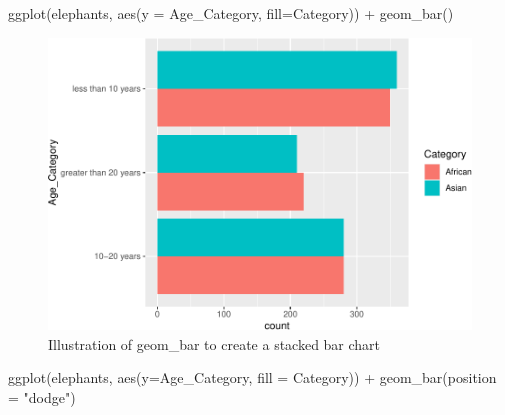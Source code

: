 \documentclass[
]{book}
\newenvironment{Shaded}{\begin{snugshade}}{\end{snugshade}}
\newcommand{\AttributeTok}[1]{\textcolor[rgb]{0.77,0.63,0.00}{#1}}
\newcommand{\FunctionTok}[1]{\textcolor[rgb]{0.00,0.00,0.00}{#1}}
\newcommand{\NormalTok}[1]{#1}
\newcommand{\SpecialCharTok}[1]{\textcolor[rgb]{0.00,0.00,0.00}{#1}}
\newcommand{\StringTok}[1]{\textcolor[rgb]{0.31,0.60,0.02}{#1}}
\begin{document}
\begin{Shaded}
\begin{Highlighting}[]
\FunctionTok{ggplot}\NormalTok{(elephants, }\FunctionTok{aes}\NormalTok{(}\AttributeTok{y =}\NormalTok{ Age\_Category, }\AttributeTok{fill=}\NormalTok{Category)) }\SpecialCharTok{+} 
  \FunctionTok{geom\_bar}\NormalTok{()}
\end{Highlighting}
\end{Shaded}

\begin{figure}
\centering
\includegraphics{Data-Visualisation-geom-Encyclopedia_files/figure-latex/unnamed-chunk-20-1.pdf}
\caption{\label{fig:unnamed-chunk-20}Illustration of geom\_bar to create a stacked bar chart}
\end{figure}

\begin{Shaded}
\begin{Highlighting}[]
\FunctionTok{ggplot}\NormalTok{(elephants, }\FunctionTok{aes}\NormalTok{(}\AttributeTok{y=}\NormalTok{Age\_Category, }\AttributeTok{fill =}\NormalTok{ Category)) }\SpecialCharTok{+}
  \FunctionTok{geom\_bar}\NormalTok{(}\AttributeTok{position =} \StringTok{"dodge"}\NormalTok{)}
\end{Highlighting}
\end{Shaded}
\end{document}

